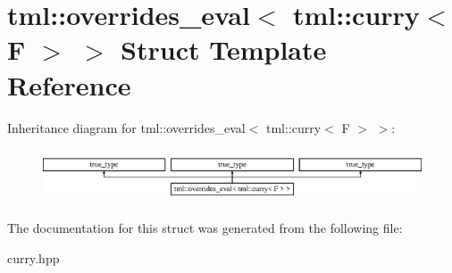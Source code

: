 \hypertarget{structtml_1_1overrides__eval_3_01tml_1_1curry_3_01F_01_4_01_4}{\section{tml\+:\+:overrides\+\_\+eval$<$ tml\+:\+:curry$<$ F $>$ $>$ Struct Template Reference}
\label{structtml_1_1overrides__eval_3_01tml_1_1curry_3_01F_01_4_01_4}
}
Inheritance diagram for tml\+:\+:overrides\+\_\+eval$<$ tml\+:\+:curry$<$ F $>$ $>$\+:\begin{figure}[H]
\begin{center}
\leavevmode
\includegraphics[height=1.595442cm]{structtml_1_1overrides__eval_3_01tml_1_1curry_3_01F_01_4_01_4}
\end{center}
\end{figure}


The documentation for this struct was generated from the following file\+:\begin{DoxyCompactItemize}
\item 
curry.\+hpp\end{DoxyCompactItemize}
